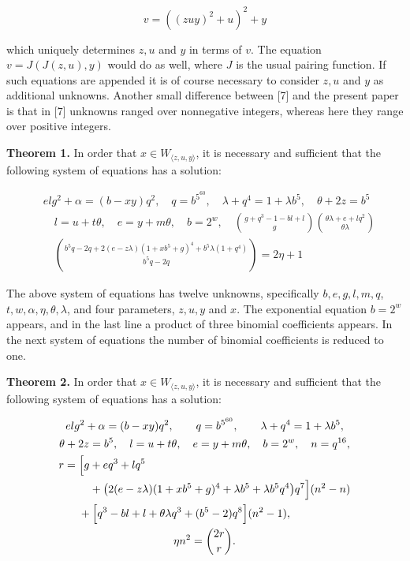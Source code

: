 \documentclass[11pt,a4paper]{article}
\newcommand{\origpage}[1]{\marginnote{\footnotesize\textbf{[#1]}}}
\begin{document}
\[
v=\left((z u y)^{2}+u\right)^{2}+y
\]

which uniquely determines $z,\allowbreak  u$ and $y$ in terms of $v$. The equation $v=J(J(z,\allowbreak  u),\allowbreak  y)$ would do as well, where $J$ is the usual pairing function. If such equations are appended it is of course necessary to consider $z,\allowbreak  u$ and $y$ as additional unknowns. Another small difference between [7] and the present paper is that in [7] unknowns ranged over nonnegative integers, whereas here they range over positive integers.

\noindent\textbf{Theorem 1.} In order that $x \in W_{\langle z, u, y\rangle}$, it is necessary and sufficient that the following system of equations has a solution:

\[
\begin{aligned}
& e l g^{2}+\alpha=(b-x y) q^{2}, \quad q=b^{5^{60}}, \quad \lambda+q^{4}=1+\lambda b^{5}, \quad \theta+2 z=b^{5} \\
& \quad l=u+t \theta, \quad e=y+m \theta, \quad b=2^{w}, \quad\binom{g+q^{3}-1-b l+l}{g}\binom{\theta \lambda+e+l q^{2}}{\theta \lambda} \\
& \quad\binom{b^{5} q-2 q+2(e-z \lambda)\left(1+x b^{5}+g\right)^{4}+b^{5} \lambda\left(1+q^{4}\right)}{b^{5} q-2 q}=2 \eta+1
\end{aligned}
\]

\origpage{552}The above system of equations has twelve unknowns, specifically $b,\allowbreak  e,\allowbreak  g,\allowbreak  l,\allowbreak  m,\allowbreak  q$, $t,\allowbreak  w,\allowbreak  \alpha,\allowbreak  \eta,\allowbreak  \theta,\allowbreak  \lambda$, and four parameters, $z,\allowbreak  u,\allowbreak  y$ and $x$. The exponential equation $b=2^{w}$ appears, and in the last line a product of three binomial coefficients appears. In the next system of equations the number of binomial coefficients is reduced to one.

\noindent\textbf{Theorem 2.} In order that $x \in W_{\langle z, u, y\rangle}$, it is necessary and sufficient that the following system of equations has a solution:

\[
\begin{gathered}
 e l g^{2}+\alpha=(b-xy)q^{2},\qquad q=b^{5^{60}},\qquad
 \lambda+q^{4}=1+\lambda b^{5},\\
 \theta+2z=b^{5},\quad l=u+t\theta,\quad e=y+m\theta,\quad
 b=2^{w},\quad n=q^{16},\\
\begin{aligned}
r={}&\Bigl[g+e q^{3}+l q^{5}\\
 &\quad+\bigl(2(e-z\lambda)(1+xb^{5}+g)^{4}
       +\lambda b^{5}+\lambda b^{5}q^{4}\bigr)q^{7}\Bigr](n^{2}-n)\\
 &+\Bigl[q^{3}-bl+l+\theta\lambda q^{3}+(b^{5}-2)q^{8}\Bigr](n^{2}-1),
\end{aligned}\\
 \eta n^{2}=\binom{2r}{r}.
\end{gathered}
\]
\end{document}
